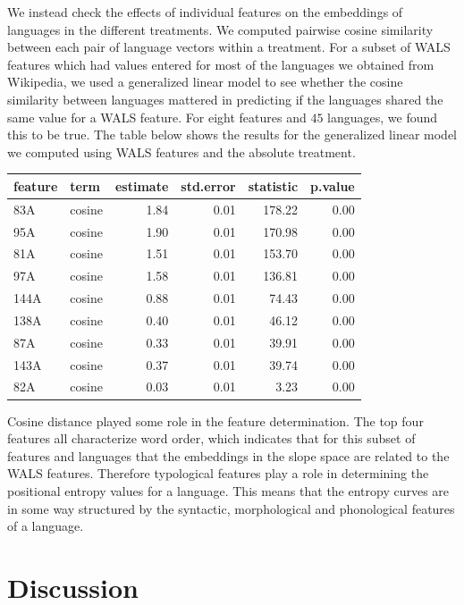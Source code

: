 \documentclass[10pt, letterpaper]{article}
\begin{document}
We instead check the effects of individual features on the embeddings of
languages in the different treatments. We computed pairwise cosine
similarity between each pair of language vectors within a treatment. For
a subset of WALS features which had values entered for most of the
languages we obtained from Wikipedia, we used a generalized linear model
to see whether the cosine similarity between languages mattered in
predicting if the languages shared the same value for a WALS feature.
For eight features and \(45\) languages, we found this to be true. The
table below shows the results for the generalized linear model we
computed using WALS features and the absolute treatment.

\begin{table}[tb]
\centering
\begin{tabular}{llrrrr}
  \hline
feature & term & estimate & std.error & statistic & p.value \\ 
  \hline
83A & cosine & 1.84 & 0.01 & 178.22 & 0.00 \\ 
  95A & cosine & 1.90 & 0.01 & 170.98 & 0.00 \\ 
  81A & cosine & 1.51 & 0.01 & 153.70 & 0.00 \\ 
  97A & cosine & 1.58 & 0.01 & 136.81 & 0.00 \\ 
  144A & cosine & 0.88 & 0.01 & 74.43 & 0.00 \\ 
  138A & cosine & 0.40 & 0.01 & 46.12 & 0.00 \\ 
  87A & cosine & 0.33 & 0.01 & 39.91 & 0.00 \\ 
  143A & cosine & 0.37 & 0.01 & 39.74 & 0.00 \\ 
  82A & cosine & 0.03 & 0.01 & 3.23 & 0.00 \\ 
   \hline
\end{tabular}
\end{table}

Cosine distance played some role in the feature determination. The top
four features all characterize word order, which indicates that for this
subset of features and languages that the embeddings in the slope space
are related to the WALS features. Therefore typological features play a
role in determining the positional entropy values for a language. This
means that the entropy curves are in some way structured by the
syntactic, morphological and phonological features of a language.

\section{Discussion}\label{discussion}
\end{document}
